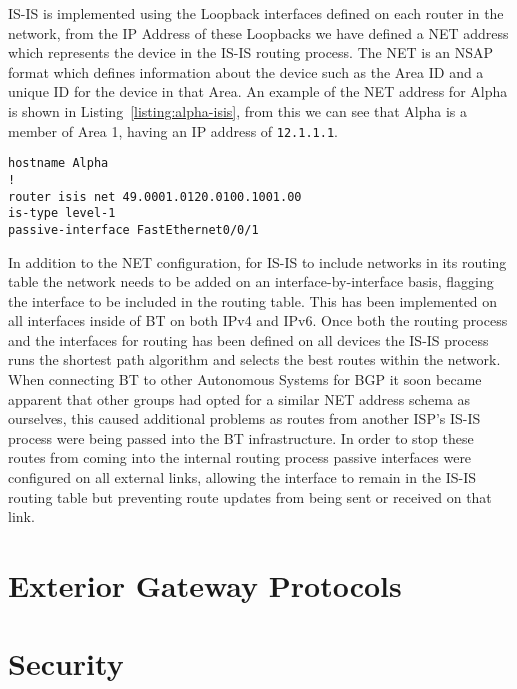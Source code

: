 IS-IS is implemented using the Loopback interfaces defined on each router in the
network, from the IP Address of these Loopbacks we have defined a NET address
which represents the device in the IS-IS routing process. The NET is an NSAP
format which defines information about the device such as the Area ID and a
unique ID for the device in that Area. An example of the NET address for Alpha
is shown in Listing~\ref{listing:alpha-isis}, from this we can see that Alpha is
a member of Area 1, having an IP address of \texttt{12.1.1.1}.

\begin{lstlisting}[caption={Alpha IS-IS Configuration}, label={listing:alpha-isis}]
hostname Alpha 
!  
router isis net 49.0001.0120.0100.1001.00  
is-type level-1  
passive-interface FastEthernet0/0/1  
\end{lstlisting}

In addition to the NET configuration, for IS-IS to include networks in its
routing table the network needs to be added on an interface-by-interface basis,
flagging the interface to be included in the routing table. This has been
implemented on all interfaces inside of BT on both IPv4 and IPv6. Once both the
routing process and the interfaces for routing has been defined on all devices
the IS-IS process runs the shortest path algorithm and selects the best routes
within the network. When connecting BT to other Autonomous Systems for BGP it
soon became apparent that other groups had opted for a similar NET address
schema as ourselves, this caused additional problems as routes from another
ISP's IS-IS process were being passed into the BT infrastructure. In order to
stop these routes from coming into the internal routing process passive
interfaces were configured on all external links, allowing the interface to
remain in the IS-IS routing table but preventing route updates from being sent
or received on that link.

\section{Exterior Gateway Protocols}
\section{Security}

